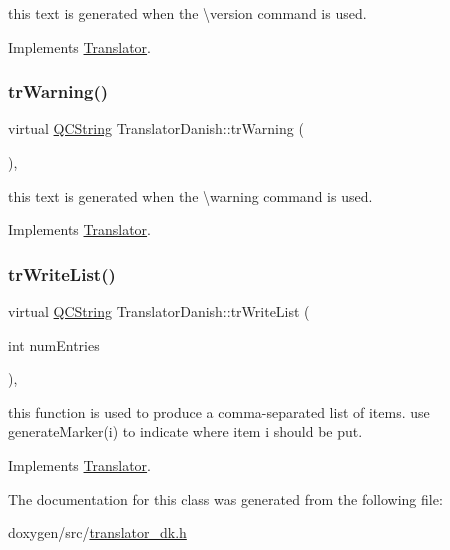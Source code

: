 this text is generated when the \textbackslash{}version command is used. 

Implements \mbox{\hyperlink{class_translator}{Translator}}.

\mbox{\label{class_translator_danish_a8fb5364c3f0c25f881cc5e17804cecf2}} 
\subsubsection{\texorpdfstring{trWarning()}{trWarning()}}
{\footnotesize\ttfamily virtual \mbox{\hyperlink{class_q_c_string}{Q\+C\+String}} Translator\+Danish\+::tr\+Warning (\begin{DoxyParamCaption}{ }\end{DoxyParamCaption})\hspace{0.3cm}{\ttfamily [inline]}, {\ttfamily [virtual]}}

this text is generated when the \textbackslash{}warning command is used. 

Implements \mbox{\hyperlink{class_translator}{Translator}}.

\mbox{\label{class_translator_danish_ae6dd9f8fb876f6a70629593a306af7cf}} 
\subsubsection{\texorpdfstring{trWriteList()}{trWriteList()}}
{\footnotesize\ttfamily virtual \mbox{\hyperlink{class_q_c_string}{Q\+C\+String}} Translator\+Danish\+::tr\+Write\+List (\begin{DoxyParamCaption}\item[{int}]{num\+Entries }\end{DoxyParamCaption})\hspace{0.3cm}{\ttfamily [inline]}, {\ttfamily [virtual]}}

this function is used to produce a comma-\/separated list of items. use generate\+Marker(i) to indicate where item i should be put. 

Implements \mbox{\hyperlink{class_translator}{Translator}}.



The documentation for this class was generated from the following file\+:\begin{DoxyCompactItemize}
\item 
doxygen/src/\mbox{\hyperlink{translator__dk_8h}{translator\+\_\+dk.\+h}}\end{DoxyCompactItemize}
